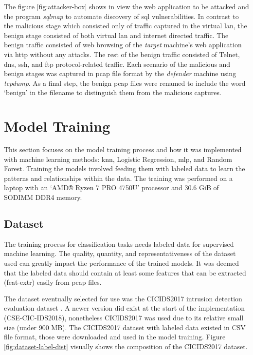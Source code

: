 The figure \ref{fig:attacker-box} shows in view the web application to be attacked and the program \emph{sqlmap} to automate discovery of \gls{sql} vulnerabilities.
In contrast to the malicious stage which consisted only of traffic captured in the virtual \gls{lan},
the benign stage consisted of both virtual \gls{lan} and internet directed traffic.
The benign traffic consisted of web browsing of the \emph{target} machine's web application via \gls{http} without any attacks.
The rest of the benign traffic consisted of Telnet, \gls{dns}, \gls{ssh}, and \gls{ftp} protocol-related traffic.
Each scenario of the malicious and benign stages was captured in \gls{pcap} file format by the \emph{defender} machine using \emph{tcpdump}.
As a final step, the benign \gls{pcap} files were renamed to include the word `benign' in the filename to distinguish them from the malicious captures.


\section{Model Training}\label{sec:model-training}

This section focuses on the model training process and how it was implemented with machine learning methods:
\gls{knn}, Logistic Regression, \gls{mlp}, and Random Forest.
Training the models involved feeding them with labeled data to learn the patterns and relationships within the data.
The training was performed on a laptop with an `AMD® Ryzen 7 PRO 4750U' processor and 30.6 GiB of SODIMM DDR4 memory.

\subsection{Dataset}
The training process for classification tasks needs labeled data for supervised machine learning.
The quality, quantity, and representativeness of the dataset used can greatly impact the performance of the trained models.
It was deemed that the labeled data should contain at least some features that can be extracted (\gls{feat-extr}) easily from \gls{pcap} files.


The dataset eventually selected for use was the CICIDS2017 intrusion detection evaluation dataset \cite{sharafaldin2018toward}.
A newer version did exist at the start of the implementation (CSE-CIC-IDS2018), nonetheless CICIDS2017 was used due to its relative small size (under 900 MB).
The CICIDS2017 dataset with labeled data existed in CSV file format, those were downloaded and used in the model training.
Figure \ref{fig:dataset-label-dist} visually shows the composition of the CICIDS2017 dataset.

